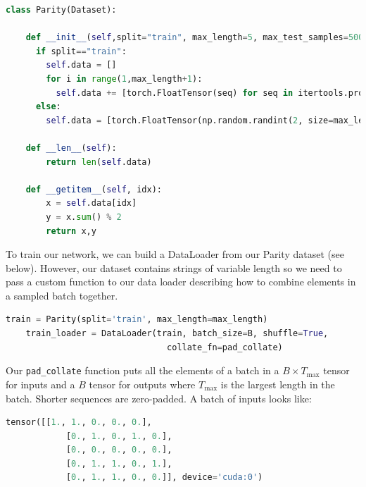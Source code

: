 \documentclass[a4paper,10pt]{article}
\begin{document}
\begin{center}
\begin{minipage}{0.8\textwidth}
\begin{lstlisting}[language=Python, caption=Parity Dataset]
class Parity(Dataset):

    def __init__(self,split="train", max_length=5, max_test_samples=500):
      if split=="train":
        self.data = []
        for i in range(1,max_length+1):
          self.data += [torch.FloatTensor(seq) for seq in itertools.product([0,1], repeat=i)]
      else:
        self.data = [torch.FloatTensor(np.random.randint(2, size=max_length)) for i in range(max_test_samples)]

    def __len__(self):
        return len(self.data)

    def __getitem__(self, idx):
        x = self.data[idx]
        y = x.sum() % 2
        return x,y 
\end{lstlisting}
\end{minipage}
\end{center}

\noindent To train our network, we can build a DataLoader from our Parity dataset (see below). However, our dataset contains strings of variable length so we need to pass a custom function to our data loader describing how to combine elements in a sampled batch together.


\begin{center}
\begin{minipage}{0.8\textwidth}
\begin{lstlisting}[language=Python, caption=Data loader]
    train = Parity(split='train', max_length=max_length)
    train_loader = DataLoader(train, batch_size=B, shuffle=True,
                                collate_fn=pad_collate)
\end{lstlisting}
\end{minipage}
\end{center}

\noindent Our \texttt{pad\_collate} function puts all the elements of a batch in a $B \times T_{\mbox{max}}$ tensor for inputs and a $B$ tensor for outputs where $T_{\mbox{max}}$ is the largest length in the batch. Shorter sequences are zero-padded. A batch of inputs looks like: 

\begin{center}
\begin{minipage}{0.8\textwidth}
\begin{lstlisting}[language=Python, caption=Example input for a batch]
    tensor([[1., 1., 0., 0., 0.],
            [0., 1., 0., 1., 0.],
            [0., 0., 0., 0., 0.],
            [0., 1., 1., 0., 1.],
            [0., 1., 1., 0., 0.]], device='cuda:0')
\end{lstlisting}
\end{minipage}
\end{center}
\end{document}
